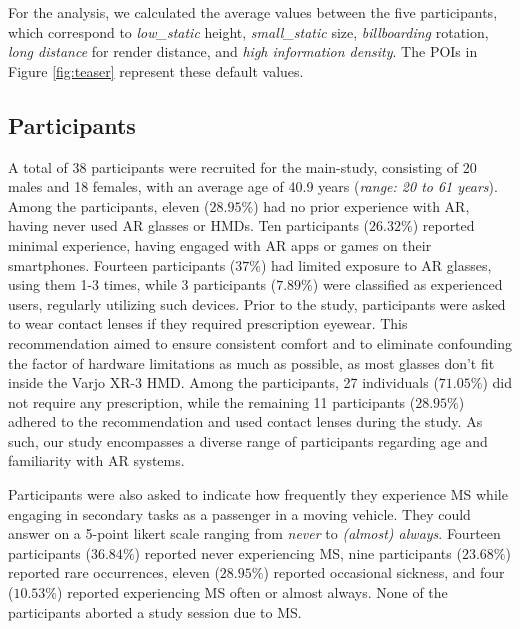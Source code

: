 For the analysis, we calculated the average values between the five participants, which correspond to \textit{low\_static} height, \textit{small\_static} size, \textit{billboarding} rotation, \textit{long distance} for render distance, and \textit{high information density}. The POIs in Figure \ref{fig:teaser} represent these default values.

\subsection{Participants}
\label{sec:participants}
A total of 38 participants were recruited for the main-study, consisting of 20 males and 18 females, with an average age of 40.9 years (\textit{range: 20 to 61 years}). Among the participants, eleven ($28.95\%$) had no prior experience with AR, having never used AR glasses or HMDs. Ten participants ($26.32\%$) reported minimal experience, having engaged with AR apps or games on their smartphones. Fourteen participants ($37\%$) had limited exposure to AR glasses, using them 1-3 times, while 3 participants ($7.89\%$) were classified as experienced users, regularly utilizing such devices. Prior to the study, participants were asked to wear contact lenses if they required prescription eyewear. This recommendation aimed to ensure consistent comfort and to eliminate confounding the factor of hardware limitations as much as possible, as most glasses don't fit inside the Varjo XR-3 HMD. Among the participants, 27 individuals ($ 71.05\%$) did not require any prescription, while the remaining 11 participants ($28.95\%$) adhered to the recommendation and used contact lenses during the study. As such, our study encompasses a diverse range of participants regarding age and familiarity with AR systems.

Participants were also asked to indicate how frequently they experience MS while engaging in secondary tasks as a passenger in a moving vehicle. They could answer on a 5-point likert scale ranging from \textit{never} to \textit{(almost) always}. Fourteen participants ($36.84\%$) reported never experiencing MS, nine participants ($23.68\%$) reported rare occurrences, eleven ($28.95\%$) reported occasional sickness, and four ($10.53\%$) reported experiencing MS often or almost always. None of the participants aborted a study session due to MS.


